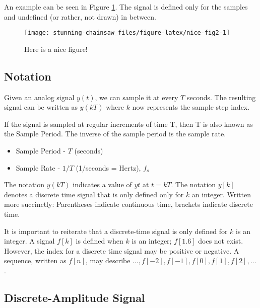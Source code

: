\documentclass[
]{book}
\providecommand{\tightlist}{%
  \setlength{\itemsep}{0pt}\setlength{\parskip}{0pt}}
\theoremstyle{definition}
\theoremstyle{definition}
\theoremstyle{definition}
\theoremstyle{remark}
\begin{document}
An example can be seen in Figure \ref{fig:nice-fig2}. The signal is defined only for the samples and undefined (or rather, not drawn) in between.

\begin{figure}

{\centering \texttt{[image: stunning-chainsaw\_files/figure-latex/nice-fig2-1]} 

}

\caption{Here is a nice figure!}\label{fig:nice-fig2}
\end{figure}

\hypertarget{notation}{%
\subsection{Notation}\label{notation}}

Given an analog signal \(y(t)\), we can sample it at every \(T\) seconds. The resulting signal can be written as \(y(kT)\) where \(k\) now represents the sample step index.

If the signal is sampled at regular increments of time T, then T is also known as the Sample Period. The inverse of the sample period is the sample rate.

\begin{itemize}
\tightlist
\item
  Sample Period - \(T\) (seconds)
\item
  Sample Rate - \(1/T\) (1/seconds = Hertz), \(f_s\)
\end{itemize}

The notation \(y(kT)\) indicates a value of \(y{t}\) at \(t=kT\). The notation \(y[k]\) denotes a discrete time signal that is only defined only for \(k\) an integer. Written more succinctly: Parentheses indicate continuous time, brackets indicate discrete time.

It is important to reiterate that a discrete-time signal is only defined for \(k\) is an integer. A signal \(f[k]\) is defined when \(k\) is an integer; \(f[1.6]\) does not exist. However, the index for a discrete time signal may be positive or negative. A sequence, written as \({f[n]}\), may describe \(...,f[-2],f[-1],f[0],f[1],f[2],...\).

\hypertarget{discrete-amplitude-signal}{%
\subsection{Discrete-Amplitude Signal}\label{discrete-amplitude-signal}}
\end{document}
